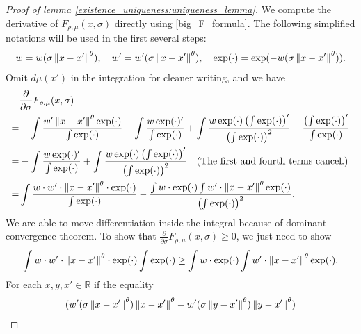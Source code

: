 \begin{proof}[Proof of lemma \ref{existence_uniqueness:uniqueness_lemma}]
    We compute the derivative of $F_{\rho,\mu}(x,\sigma)$ directly using \eqref{big_F_formula}. The following simplified
    notations will be used in the first several steps:
    \begin{align}
        w = w(\sigma\left\lVert x-x'\right\rVert^{\theta}), \quad w'=w'(\sigma\left\lVert x-x'\right\rVert^{\theta}), \quad \exp(\cdot) = \exp(-w(\sigma\left\lVert x-x'\right\rVert^{\theta})).
    \end{align}
    Omit $d\mu(x')$ in the integration for cleaner writing, and we have
    \begin{align}
          & \frac{\partial}{\partial \sigma} F_{\rho,\mu}(x,\sigma) \nonumber                                                                                                                                    \\
        = & -\int \frac{w'\left\lVert x-x'\right\rVert^{\theta}\exp(\cdot)}{\int \exp(\cdot)} -\int \frac{w\exp(\cdot)'}{\int \exp(\cdot)} +
        \int \frac{w \exp(\cdot) \left(\int \exp(\cdot)\right)'}{\left(\int \exp(\cdot)\right)^2} - \frac{\left(\int \exp(\cdot)\right)'}{\int \exp(\cdot)} \nonumber                                            \\
        = & -\int \frac{w\exp(\cdot)'}{\int \exp(\cdot)} +
        \int \frac{w \exp(\cdot) \left(\int \exp(\cdot)\right)'}{\left(\int \exp(\cdot)\right)^2} \quad \text{\normalfont (The first and fourth terms cancel.)} \nonumber                                        \\
        = & \int \frac{w\cdot w' \cdot \left\lVert x-x'\right\rVert^{\theta} \cdot \exp(\cdot)}{\int \exp(\cdot)}-\frac{\int w \cdot \exp(\cdot) \int w'\cdot \left\lVert x-x'\right\rVert^{\theta} \exp(\cdot)}{\left(\int \exp(\cdot)\right)^2}.
    \end{align}
    We are able to move differentiation inside the integral because of dominant convergence theorem. To show that $\frac{\partial}{\partial \sigma} F_{\rho,\mu}(x,\sigma) \geq 0$, we just need to show
    \begin{align} \label{monotone_inequ}
        \int w\cdot w' \cdot \left\lVert x-x'\right\rVert^{\theta} \cdot \exp(\cdot) \int \exp(\cdot) \geq \int w \cdot \exp(\cdot) \int w'\cdot \left\lVert x-x'\right\rVert^{\theta} \exp(\cdot).
    \end{align}
    For each $x,y,x' \in \mathbb{R}$ if the equality
    \begin{align} \label{monotone_condition}
         & (w'(\sigma\norm{x-x'}^{\theta})\norm{x-x'}^{\theta}-w'(\sigma\norm{y-x'}^{\theta})\norm{y-x'}^{\theta}) \nonumber                                   \\

\end{align}
\end{proof}
